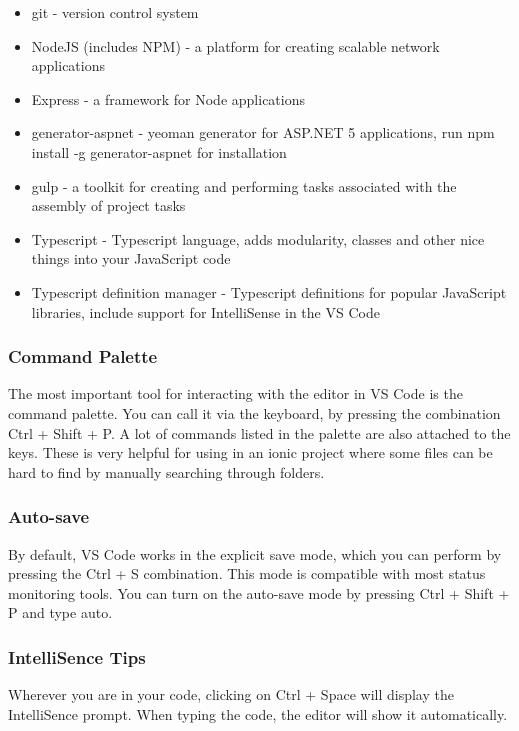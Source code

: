 \documentclass[12pt,a4paper,oneside,openany]{book}
\begin{document}
\begin{itemize}
\item git - version control system

\item NodeJS (includes NPM) - a platform for creating scalable network applications

\item Express - a framework for Node applications

\item generator-aspnet - yeoman generator for ASP.NET 5 applications, run npm install -g generator-aspnet for installation

\item gulp - a toolkit for creating and performing tasks associated with the assembly of project tasks

\item Typescript - Typescript language, adds modularity, classes and other nice things into your JavaScript code

\item Typescript definition manager - Typescript definitions for popular JavaScript libraries, include support for IntelliSense in the VS Code 

\end{itemize}

\subsubsection{Command Palette}
The most important tool for interacting with the editor in VS Code is the command palette. You can call it via the keyboard, by pressing the combination Ctrl + Shift + P. A lot of commands listed in the palette are also attached to the keys. These is very helpful for using in an ionic project where some files can be hard to find by manually searching through folders. \cite{vsTips}

\subsubsection{Auto-save}
By default, VS Code works in the explicit save mode, which you can perform by pressing the Ctrl + S combination. This mode is compatible with most status monitoring tools. You can turn on the auto-save mode by pressing Ctrl + Shift + P and type auto. \cite{vsTips}

\subsubsection{IntelliSence Tips}
Wherever you are in your code, clicking on Ctrl + Space will display the IntelliSence prompt. When typing the code, the editor will show it automatically. \cite{vsTips}
\end{document}
